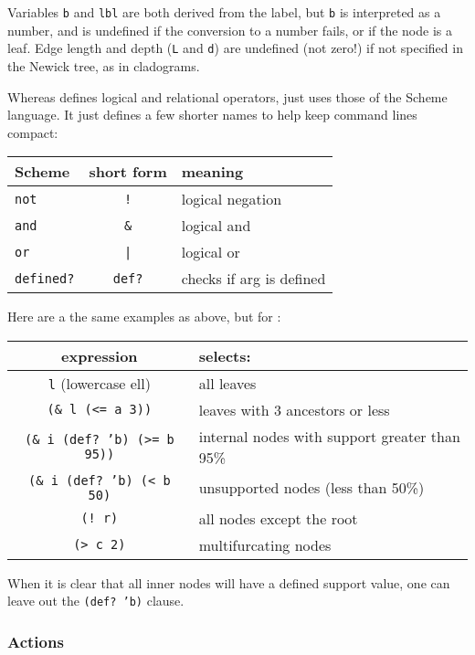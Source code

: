 \noindent{}Variables \texttt{b} and \texttt{lbl} are both derived from the
label, but \texttt{b} is interpreted as a number, and is undefined if the
conversion to a number fails, or if the node is a leaf. Edge length and depth
(\texttt{L} and \texttt{d}) are undefined (not zero!) if not specified in the
Newick tree, as in cladograms.

Whereas \ed{} defines logical and relational operators, \sched{} just uses those
of the Scheme language. It just defines a few shorter names to help keep command
lines compact:

\begin{center}
\begin{tabular}{lcl}
Scheme & \sched{} short form & meaning \\
\hline
\texttt{not} 	& \texttt{!} 				& logical negation \\
\texttt{and} 	& \texttt{\&} 			& logical and \\
\texttt{or}  	& \texttt{|} 				& logical or \\
\texttt{defined?}	& \texttt{def?}	& checks if arg is defined
\end{tabular}
\end{center}

\noindent{}Here are a the same examples as above, but for \sched:

\begin{center}
\begin{tabular}{cl}
expression & selects: \\
\hline
\texttt{l} (lowercase ell) & all leaves \\
\texttt{(\& l (<= a 3))} & leaves with 3 ancestors or less \\
\texttt{(\& i (def? 'b) (>= b 95))} & internal nodes with support greater than 95\% \\ 
\texttt{(\& i (def? 'b) (< b 50)} & unsupported nodes (less than 50\%) \\
\texttt{(! r)} & all nodes except the root \\
\texttt{(> c 2)} & multifurcating nodes
\end{tabular}
\end{center}

\noindent{}When it is clear that all inner nodes will have a defined support
value, one can leave out the \texttt{(def? 'b)} clause.

\subsubsection{Actions}

